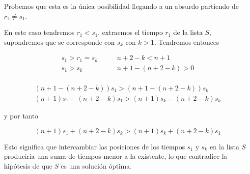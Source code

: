 \documentclass[a4]{article}
\begin{document}
Probemos que esta es la única posibilidad llegando a un absurdo
partiendo de $r_1 \neq s_1$.

En este caso tendremos $r_1 < s_1$, extraemos el
tiempo $r_1$ de la lista $S$, supondremos que se corresponde con $s_k$
con $k > 1$. Tendremos entonces

\begin{align*}
  s_1 > r_1 = s_k& \qquad n+2-k < n+1 \\
  s_1 > s_k& \qquad n+1 - (n+2-k) > 0 \\
\end{align*}

\vspace{-15mm}

\begin{align*}    
  (n+1-(n+2-k))s_1 > (n+1-(n+2-k))s_k \\
  (n+1)s_1 - (n+2-k)s_1 > (n+1)s_k - (n+2-k)s_k
\end{align*}

y por tanto

\[(n+1)s_1 + (n+2-k)s_k > (n+1)s_k + (n+2-k)s_1\]

Esto significa que intercambiar las posiciones de los tiempos $s_1$ y
$s_k$ en la lista $S$ produciría una suma de tiempos menor a la
existente, lo que contradice la hipótesis de que $S$ es una solución
óptima.

\hfill\qedsymbol
\end{document}
